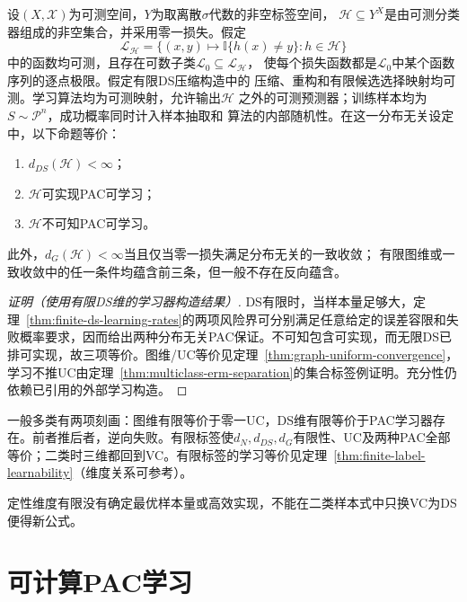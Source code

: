 \begin{theorem}[多分类学习基本定理]
\label{thm:ds-characterization}
设$(X,\mathcal X)$为可测空间，$Y$为取离散$\sigma$代数的非空标签空间，
$\mathcal H\subseteq Y^X$是由可测分类器组成的非空集合，并采用零一损失。假定
\[
 \mathcal L_{\mathcal H}
 =\{(x,y)\mapsto\mathbb I\{h(x)\neq y\}:h\in\mathcal H\}
\]
中的函数均可测，且存在可数子类$\mathcal L_0\subseteq\mathcal L_{\mathcal H}$，
使每个损失函数都是$\mathcal L_0$中某个函数序列的逐点极限。假定有限DS压缩构造中的
压缩、重构和有限候选选择映射均可测。学习算法均为可测映射，允许输出$\mathcal H$
之外的可测预测器；训练样本均为$S\sim\mathcal P^n$，成功概率同时计入样本抽取和
算法的内部随机性。在这一分布无关设定中，以下命题等价：
\begin{enumerate}
 \item $d_{DS}(\mathcal H)<\infty$；
 \item $\mathcal H$可实现PAC可学习；
 \item $\mathcal H$不可知PAC可学习。
\end{enumerate}
此外，$d_G(\mathcal H)<\infty$当且仅当零一损失满足分布无关的一致收敛；
有限图维或一致收敛中的任一条件均蕴含前三条，但一般不存在反向蕴含。
\end{theorem}

\begin{proof}[证明（使用有限DS维的学习器构造结果）]
DS有限时，当样本量足够大，定理~\ref{thm:finite-ds-learning-rates}的两项风险界可分别满足任意给定的误差容限和失败概率要求，因而给出两种分布无关PAC保证。不可知包含可实现，而无限DS已排可实现，故三项等价。图维/UC等价见定理~\ref{thm:graph-uniform-convergence}，学习不推UC由定理~\ref{thm:multiclass-erm-separation}的集合标签例证明。充分性仍依赖已引用的外部学习构造。
\end{proof}

一般多类有两项刻画：图维有限等价于零一UC，DS维有限等价于PAC学习器存在。前者推后者，逆向失败。有限标签使$d_N,d_{DS},d_G$有限性、UC及两种PAC全部等价；二类时三维都回到VC。有限标签的学习等价见定理~\ref{thm:finite-label-learnability}（维度关系可参考）。

定性维度有限没有确定最优样本量或高效实现，不能在二类样本式中只换VC为DS便得新公式。

\section{可计算PAC学习}
\label{sec:computable-multiclass-learning}

